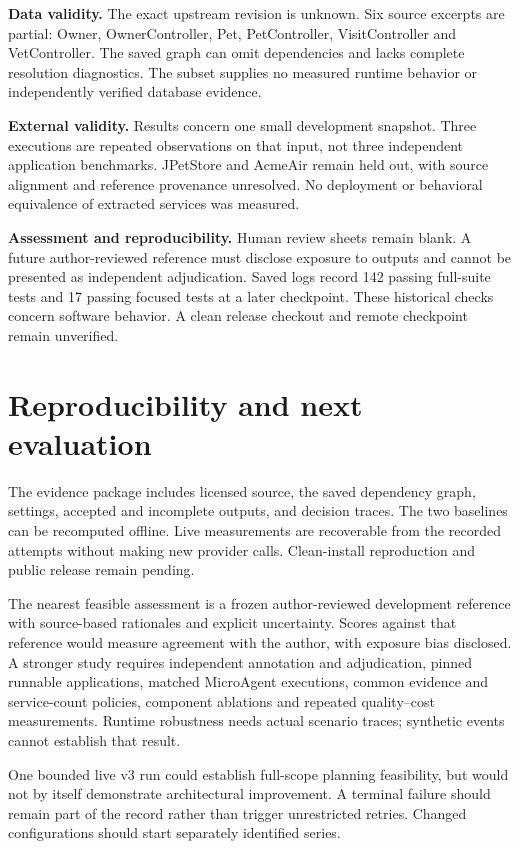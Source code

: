 \textbf{Data validity.} The exact upstream revision is unknown. Six source excerpts are partial: Owner, OwnerController, Pet, PetController, VisitController and VetController. The saved graph can omit dependencies and lacks complete resolution diagnostics. The subset supplies no measured runtime behavior or independently verified database evidence.

\textbf{External validity.} Results concern one small development snapshot. Three executions are repeated observations on that input, not three independent application benchmarks. JPetStore and AcmeAir remain held out, with source alignment and reference provenance unresolved. No deployment or behavioral equivalence of extracted services was measured.

\textbf{Assessment and reproducibility.} Human review sheets remain blank. A future author-reviewed reference must disclose exposure to outputs and cannot be presented as independent adjudication. Saved logs record 142 passing full-suite tests and 17 passing focused tests at a later checkpoint. These historical checks concern software behavior. A clean release checkout and remote checkpoint remain unverified.

\section{Reproducibility and next evaluation}

The evidence package includes licensed source, the saved dependency graph, settings, accepted and incomplete outputs, and decision traces. The two baselines can be recomputed offline. Live measurements are recoverable from the recorded attempts without making new provider calls. Clean-install reproduction and public release remain pending.

The nearest feasible assessment is a frozen author-reviewed development reference with source-based rationales and explicit uncertainty. Scores against that reference would measure agreement with the author, with exposure bias disclosed. A stronger study requires independent annotation and adjudication, pinned runnable applications, matched MicroAgent executions, common evidence and service-count policies, component ablations and repeated quality--cost measurements. Runtime robustness needs actual scenario traces; synthetic events cannot establish that result.

One bounded live v3 run could establish full-scope planning feasibility, but would not by itself demonstrate architectural improvement. A terminal failure should remain part of the record rather than trigger unrestricted retries. Changed configurations should start separately identified series.

